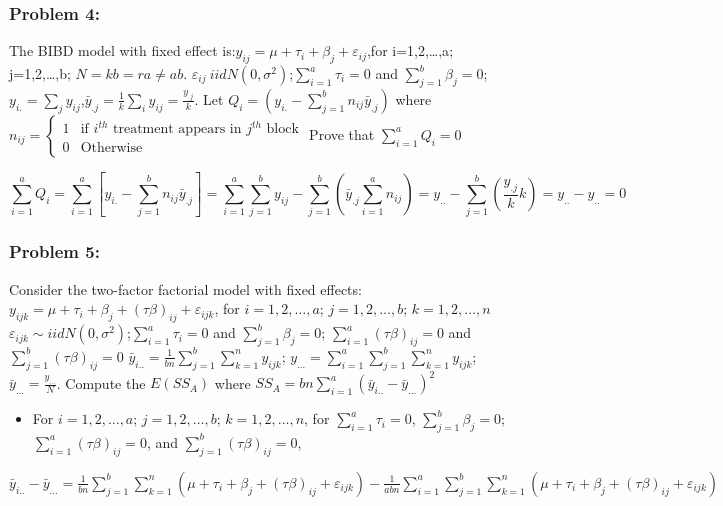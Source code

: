 \documentclass[]{article}
\providecommand{\tightlist}{%
  \setlength{\itemsep}{0pt}\setlength{\parskip}{0pt}}
\begin{document}
\hypertarget{problem-4}{%
\subsubsection{Problem 4:}\label{problem-4}}

The BIBD model with fixed effect is:\(y_{ij}=μ+τ_i+β_j+ε_{ij}\),for
i=1,2,\ldots{},a\(;\)j=1,2,\ldots{},b; \(N=kb=ra≠ab\).
\(ε_{ij} ~ iidN(0,σ^2)\);\(\sum_{i=1}^aτ_i=0\) and
\(\sum_{j=1}^bβ_j =0\);
\(y_{i.}=\sum_jy_{ij}\),\(\bar y_{.j}=\frac1k\sum_iy_{ij}=\frac{y_{.j}}k\).
Let \(Q_i=(y_{i.}-\sum_{j=1}^bn_{ij}\bar y_{.j})\) where
\(n_{ij}=\begin{cases}1& \text{if } i^{th} \text{ treatment appears in } j^{th}\text{ block}\\0&\text{Otherwise}\end{cases}\)
Prove that \(\sum_{i=1}^aQ_i=0\)

\[\sum_{i=1}^aQ_i=\sum_{i=1}^a[y_{i.}-\sum_{j=1}^bn_{ij}\bar y_{.j}]=\sum_{i=1}^a\sum_{j=1}^b y_{ij}-\sum_{j=1}^b(\bar y_{.j}\sum_{i=1}^an_{ij})=y_{..}-\sum_{j=1}^b(\frac{y_{.j}}kk)=y_{..}-y_{..}=0\]

\hypertarget{problem-5}{%
\subsubsection{Problem 5:}\label{problem-5}}

Consider the two-factor factorial model with fixed effects:
\(y_{ijk}=μ+τ_i+β_j+(τβ)_{ij}+ε_{ijk}\), for \(i=1,2,…,a\);
\(j=1,2,…,b\); \(k=1,2,…,n\)
\(ε_{ijk}\sim iid N(0,σ^2)\);\(\sum_{i=1}^aτ_i=0\) and
\(\sum_{j=1}^bβ_j=0\); \(\sum_{i=1}^a(τβ)_{ij}=0\) and
\(\sum_{j=1}^b(τβ)_{ij}=0\)
\(\bar y_{i..}=\frac1{bn}\sum_{j=1}^b\sum_{k=1}^ny_{ijk}\);
\(y_{...}=\sum_{i=1}^a\sum_{j=1}^b\sum_{k=1}^ny_{ijk}\);
\(\bar y_{...}=\frac{y_{...}}N\). Compute the \(E(SS_A)\) where
\(SS_A=bn\sum_{i=1}^a(\bar y_{i..}-\bar y_{...})^2\)

\begin{itemize}
\tightlist
\item
  For \(i=1,2,…,a\); \(j=1,2,…,b\); \(k=1,2,…,n\), for
  \(\sum_{i=1}^aτ_i=0\), \(\sum_{j=1}^bβ_j=0\);
  \(\sum_{i=1}^a(τβ)_{ij}=0\), and \(\sum_{j=1}^b(τβ)_{ij}=0\),
\end{itemize}

\(\bar y_{i..}-\bar y_{...}=\frac1{bn}\sum\limits_{j=1}^b\sum\limits_{k=1}^n(μ+τ_i+β_j+(τβ)_{ij}+ε_{ijk})-\frac1{abn}\sum\limits_{i=1}^a\sum\limits_{j=1}^b\sum\limits_{k=1}^n(μ+τ_i+β_j+(τβ)_{ij}+ε_{ijk})\)
\end{document}

